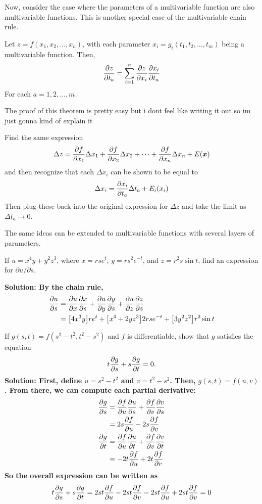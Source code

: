 Now, consider the case where the parameters of a multivariable function are also multivariable functions. This is another special case of the multivariable chain rule.
\begin{theorem}
Let \(z=f(x_1, x_2, \dots, x_n)\), with each parameter \(x_i = g_i(t_1, t_2, \dots, t_m)\) being a multivariable function. Then,
\[ \pdv{z}{t_a} = \sum_{i=1}^n \pdv{z}{x_i}\pdv{x_i}{t_a} \] 
For each \(a = 1, 2, \dots, m\).
\end{theorem}
The proof of this theorem is pretty easy but i dont feel like writing it out so im just gonna kind of explain it \par Find the same expression 
\[ \Delta z = \pdv{f}{x_1}\Delta x_1 + \pdv{f}{x_2}\Delta x_2 + \dots + \pdv{f}{x_n}\Delta x_n  + E(\boldsymbol{x}) \]
and then recognize that each \(\Delta x_i\) can be shown to be equal to
\[ \Delta x_i = \pdv{x_i}{t_a}\Delta t_a + E_i(x_i)\]
Then plug these back into the original expression for \(\Delta z\) and take the limit as \(\Delta t_a\to 0\). \par
The same ideas can be extended to multivariable functions with several layers of parameters.
\begin{example}
If \( u=x^4y+y^2z^3 \), where \(x=rse^t\), \(y=rs^2e^{-t}\), and \(z=r^2s\sin t\), find an expression for \(\partial u/\partial s\).\par\bf{Solution: }By the chain rule,
\begin{align*}
    \pdv{u}{s} &= \pdv{u}{x}\pdv{x}{s} + \pdv{u}{y}\pdv{y}{s}+\pdv{u}{z}\pdv{z}{s} \\
    &= \bqty{4x^3y}re^t + \bqty{x^4+2yz^3}2rse^{-t} + \bqty{3y^2z^2}r^2\sin t
\end{align*}
\end{example}
\begin{example}
If \(g(s,t) = f(s^2-t^2, t^2-s^2)\) and \(f\) is differentiable, show that \(g\) satisfies the equation
\[ t\pdv{g}{s} + s\pdv{g}{t} = 0.\]
\bf{Solution: }First, define \(u=s^2-t^2\) and \(v=t^2-s^2\). Then, \(g(s,t) = f(u, v)\). From there, we can compute each partial derivative:
\begin{align*}
    \pdv{g}{s} &= \pdv{f}{u}\pdv{u}{s} + \pdv{f}{v}\pdv{v}{s} \\
    &= 2s\pdv{f}{u} - 2s\pdv{f}{v} \\
    \pdv{g}{t} &= \pdv{f}{u}\pdv{u}{t} + \pdv{f}{v}\pdv{v}{t} \\
    &= -2t\pdv{f}{u} + 2t\pdv{f}{v} 
\end{align*}  
So the overall expression can be written as
\[ t\pdv{g}{s} + s\pdv{g}{t} = 2st\pdv{f}{u} - 2st\pdv{f}{v} - 2st\pdv{f}{u} + 2st\pdv{f}{v} = 0 \]
\end{example}
